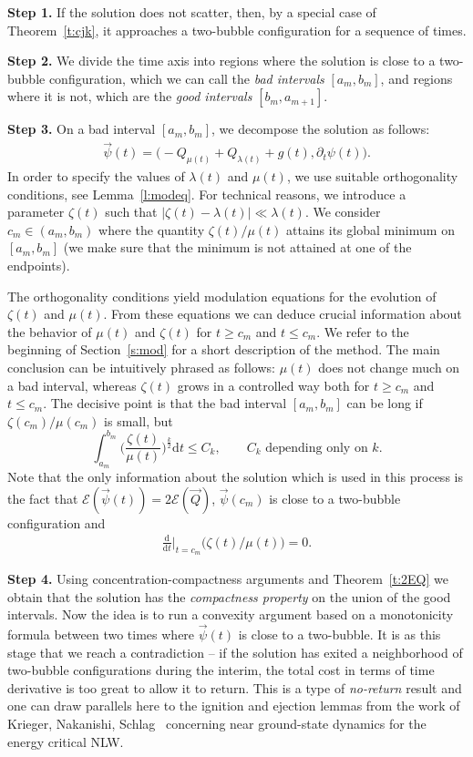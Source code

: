 \documentclass[10pt,reqno]{amsart}
\newcommand{\E}{\mathcal{E}}
\newcommand{\EQ}[1]{\begin{equation}\begin{split} #1 \end{split}\end{equation}}
\numberwithin{equation}{section}
\theoremstyle{remark}
\newcommand{\dd}[1]{\frac{\ud}{\ud{#1}}}
\newcommand{\ud}{\mathrm{d}}
\newcommand{\0}{\emptyset}
\begin{document}
 \noindent
 \textbf{Step 1.} If the solution does not scatter, then,
 by a special case of Theorem~\ref{t:cjk},
 it approaches a two-bubble configuration for a sequence of times.
 
 \noindent
 \textbf{Step 2.} We divide the time axis into regions where the solution is close
 to a two-bubble configuration, which we can call the \emph{bad intervals} $[a_m, b_m]$,
  and regions where it is not, which are the \emph{good intervals} $[b_{m}, a_{m+1}]$.
 
 \noindent
 \textbf{Step 3.} On a bad interval $[a_m, b_m]$, we decompose the solution as follows:
 \EQ{
   \vec\psi(t) = \big({-}Q_{\mu(t)} + Q_{\lambda(t)} + g(t), \partial_t \psi(t)\big).
 }
 In order to specify the values of $\lambda(t)$ and $\mu(t)$, we use suitable
 orthogonality conditions, see Lemma~\ref{l:modeq}.
 For technical reasons, we introduce a parameter $\zeta(t)$ such that $|\zeta(t) - \lambda(t)| \ll \lambda(t)$.
 We consider $c_m \in (a_m, b_m)$
 where the quantity $\zeta(t) / \mu(t)$ attains its global minimum on $[a_m, b_m]$
 (we make sure that the minimum is not attained at one of the endpoints).
 
 The orthogonality conditions yield modulation equations for the evolution
 of $\zeta(t)$ and $\mu(t)$.
 From these equations we can deduce crucial information about the behavior
 of $\mu(t)$ and $\zeta(t)$ for $t \geq c_m$ and $t \leq c_m$.
 We refer to the beginning of Section~\ref{s:mod} for a short description of the method.
 The main conclusion can be intuitively phrased as follows:
 $\mu(t)$ does not change much on a bad interval, whereas $\zeta(t)$ grows in a controlled
 way both for $t \geq c_m$ and $t \leq c_m$. The decisive point is that the bad interval
 $[a_m, b_m]$ can be long if $\zeta(c_m)/\mu(c_m)$ is small, but
 \begin{equation}
 		\int_{a_m}^{b_m} \Big(\frac{\zeta(t)}{\mu(t)}\Big)^\frac k2 \ud t \leq C_k, \qquad C_k\text{ depending only on }k. \label{eq:bad-error-contr}
 \end{equation}
 Note that the only information about the solution which is used in this process
 is the fact that $\E(\vec\psi(t)) = 2\E(\vec Q)$, $\vec\psi(c_m)$ is close to a two-bubble configuration
 and
 \EQ{
 \dd t\Big\vert_{t = c_m} \big(\zeta(t)/\mu(t)\big) = 0.
 }
 
 \noindent
 \textbf{Step 4.} Using concentration-compactness arguments and Theorem~\ref{t:2EQ}
 we obtain that the solution has the \emph{compactness property} on the union of the good intervals.
 Now the idea is to run a convexity argument based on a monotonicity formula between
 two times where $\vec\psi(t)$ is close to a two-bubble. It is as this stage that we reach a contradiction --  if the solution has exited a neighborhood of two-bubble configurations during the interim, the total cost in terms of time derivative is too great to allow it to return. This is a type of \emph{no-return} result and one can draw parallels here to the ignition and ejection lemmas from the work of Krieger, Nakanishi, Schlag~\cite{KNS13, KNS15} concerning near ground-state dynamics for the energy critical NLW.  
 
\end{document}
